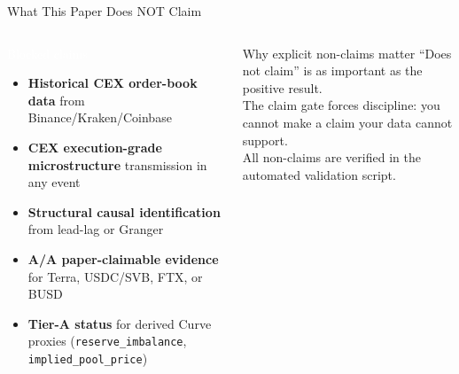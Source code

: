 \documentclass[aspectratio=169,11pt]{beamer}
\begin{document}
\begin{frame}{What This Paper Does NOT Claim}
\begin{columns}[T]
\begin{alertblock}{\textcolor{white}{Blocked claims}}
\begin{itemize}
  \item \textbf{Historical CEX order-book data} from Binance/Kraken/Coinbase
  \item \textbf{CEX execution-grade microstructure} transmission in any event
  \item \textbf{Structural causal identification} from lead-lag or Granger
  \item \textbf{A/A paper-claimable evidence} for Terra, USDC/SVB, FTX, or BUSD
  \item \textbf{Tier-A status} for derived Curve proxies (\texttt{reserve\_imbalance}, \texttt{implied\_pool\_price})
\end{itemize}
\end{alertblock}
\begin{exampleblock}{Why explicit non-claims matter}
``Does not claim'' is as important as the positive result.\\[6pt]
The claim gate forces discipline: you cannot make a claim your data cannot support.\\[6pt]
All non-claims are verified in the automated validation script.
\end{exampleblock}
\end{columns}
\end{frame}
\end{document}
